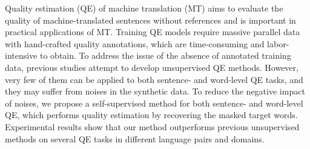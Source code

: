 Quality estimation (QE) of machine translation (MT) aims to evaluate the quality of machine-translated sentences without references and is important in practical applications of MT. Training QE models require massive parallel data with hand-crafted quality annotations, which are time-consuming and labor-intensive to obtain. To address the issue of the absence of annotated training data, previous studies attempt to develop unsupervised QE methods. However, very few of them can be applied to both sentence- and word-level QE tasks, and they may suffer from noises in the synthetic data. To reduce the negative impact of noises, we propose a self-supervised method for both sentence- and word-level QE, which performs quality estimation by recovering the masked target words. Experimental results show that our method outperforms previous unsupervised methods on several QE tasks in different language pairs and domains.
